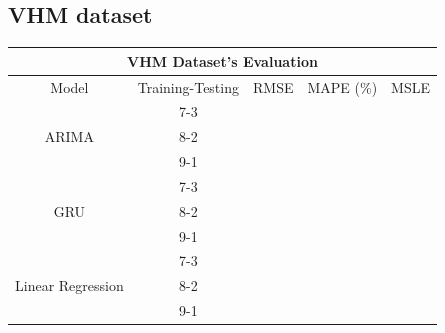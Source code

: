 \documentclass{ieeeojies}
\begin{document}
\subsection{VHM dataset} 
\begin{table}[H]
  \begin{tabular}{|ccccc|}
  \hline
  \multicolumn{5}{|c|}{\textbf{VHM Dataset's Evaluation}}                                                                                                                  \\ \hline
  \multicolumn{1}{|c|}{Model}                              & \multicolumn{1}{c|}{Training-Testing} & \multicolumn{1}{c|}{RMSE}    & \multicolumn{1}{c|}{MAPE (\%)} & MSLE  \\ \hline
  \multicolumn{1}{|c|}{\multirow{3}{*}{ARIMA}}             & \multicolumn{1}{c|}{7-3}            & \multicolumn{1}{c|}{}        & \multicolumn{1}{c|}{}          &       \\ \cline{2-5} 
  \multicolumn{1}{|c|}{}                                   & \multicolumn{1}{c|}{8-2}        & \multicolumn{1}{c|}{}        & \multicolumn{1}{c|}{}          &       \\ \cline{2-5} 
  \multicolumn{1}{|c|}{}                                   & \multicolumn{1}{c|}{9-1}        & \multicolumn{1}{c|}{}        & \multicolumn{1}{c|}{}          &       \\ \hline
  \multicolumn{1}{|c|}{\multirow{3}{*}{GRU}}               & \multicolumn{1}{c|}{7-3}            & \multicolumn{1}{c|}{}        & \multicolumn{1}{c|}{}          &       \\ \cline{2-5} 
  \multicolumn{1}{|c|}{}                                   & \multicolumn{1}{c|}{8-2}        & \multicolumn{1}{c|}{}        & \multicolumn{1}{c|}{}          &       \\ \cline{2-5} 
  \multicolumn{1}{|c|}{}                                   & \multicolumn{1}{c|}{9-1}        & \multicolumn{1}{c|}{}        & \multicolumn{1}{c|}{}          &       \\ \hline
  \multicolumn{1}{|c|}{\multirow{3}{*}{Linear Regression}} & \multicolumn{1}{c|}{7-3}            & \multicolumn{1}{c|}{}        & \multicolumn{1}{c|}{}          &       \\ \cline{2-5} 
  \multicolumn{1}{|c|}{}                                   & \multicolumn{1}{c|}{8-2}        & \multicolumn{1}{c|}{}        & \multicolumn{1}{c|}{}          &       \\ \cline{2-5} 
  \multicolumn{1}{|c|}{}                                   & \multicolumn{1}{c|}{9-1}        & \multicolumn{1}{c|}{}        & \multicolumn{1}{c|}{}          &       \\ \hline

\end{tabular}
\end{table}
\end{document}
